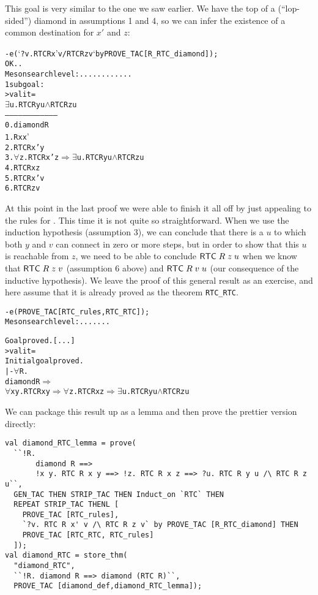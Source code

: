 This goal is very similar to the one we saw earlier.  We have the top
of a (``lop-sided'') diamond in assumptions 1 and 4, so we can infer
the existence of a common destination for $x'$ and $z$:
\begin{session}
\begin{alltt}
- e (`?v. RTC R x' v /\bs RTC R z v` by PROVE_TAC [R_RTC_diamond]);
OK..
Meson search level: ............
1 subgoal:
> val it =
    \(\exists\)u. RTC R y u \(\land\) RTC R z u
    ------------------------------------
      0.  diamond R
      1.  R x x'
      2.  RTC R x' y
      3.  \(\forall\)z. RTC R x' z \(\Rightarrow\) \(\exists\)u. RTC R y u \(\land\) RTC R z u
      4.  RTC R x z
      5.  RTC R x' v
      6.  RTC R z v
\end{alltt}
\end{session}
    At this point in the last proof we were able to finish it all off
    by just appealing to the rules for .  This time it is not
    quite so straightforward.  When we use the induction hypothesis
    (assumption 3), we can conclude that there is a $u$ to which both
    $y$ and $v$ can connect in zero or more steps, but in order to
    show that this $u$ is reachable from $z$, we need to be able to
    conclude ${\sf RTC}\;R\;z\;u$ when we know that
    ${\sf RTC}\;R\;z\;v$ (assumption 6 above) and
    ${\sf RTC}\;R\;v\;u$ (our consequence of the inductive
    hypothesis).  We leave the proof of this general result as an
    exercise, and here assume that it is already proved as the theorem
    \texttt{RTC\_RTC}.
\begin{session}
\begin{alltt}
- e (PROVE_TAC [RTC_rules, RTC_RTC]);
Meson search level: .......

Goal proved. [...]
> val it =
    Initial goal proved.
    |- \(\forall\)R.
         diamond R \(\Rightarrow\)
         \(\forall\)x y. RTC R x y \(\Rightarrow\) \(\forall\)z. RTC R x z \(\Rightarrow\) \(\exists\)u. RTC R y u \(\land\) RTC R z u
\end{alltt}
\end{session}
We can package this result up as a lemma and then prove the prettier
version directly:
\begin{session}
\begin{verbatim}
val diamond_RTC_lemma = prove(
  ``!R.
       diamond R ==>
       !x y. RTC R x y ==> !z. RTC R x z ==> ?u. RTC R y u /\ RTC R z u``,
  GEN_TAC THEN STRIP_TAC THEN Induct_on `RTC` THEN
  REPEAT STRIP_TAC THENL [
    PROVE_TAC [RTC_rules],
    `?v. RTC R x' v /\ RTC R z v` by PROVE_TAC [R_RTC_diamond] THEN
    PROVE_TAC [RTC_RTC, RTC_rules]
  ]);
val diamond_RTC = store_thm(
  "diamond_RTC",
  ``!R. diamond R ==> diamond (RTC R)``,
  PROVE_TAC [diamond_def,diamond_RTC_lemma]);
\end{verbatim}
\end{session}

